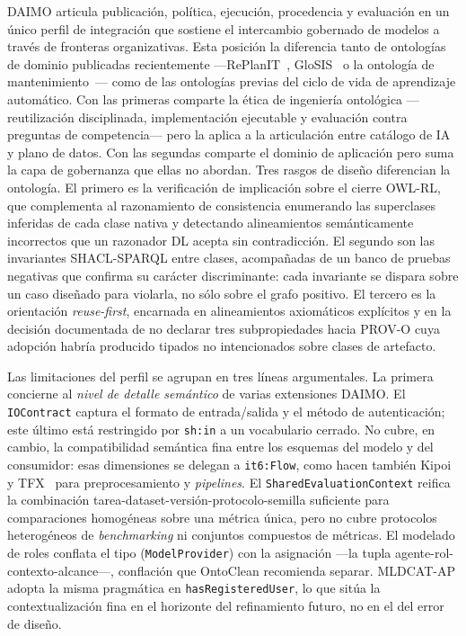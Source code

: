 \documentclass[11pt,a4paper]{article}
\newcommand{\code}[1]{\texttt{#1}}
\begin{document}
DAIMO articula publicación, política, ejecución, procedencia y evaluación en un único perfil de integración que sostiene el intercambio gobernado de modelos a través de fronteras organizativas. Esta posición la diferencia tanto de ontologías de dominio publicadas recientemente ---RePlanIT~\cite{kurteva}, GloSIS~\cite{palma} o la ontología de mantenimiento~\cite{woods}--- como de las ontologías previas del ciclo de vida de aprendizaje automático. Con las primeras comparte la ética de ingeniería ontológica ---reutilización disciplinada, implementación ejecutable y evaluación contra preguntas de competencia--- pero la aplica a la articulación entre catálogo de IA y plano de datos. Con las segundas comparte el dominio de aplicación pero suma la capa de gobernanza que ellas no abordan. Tres rasgos de diseño diferencian la ontología. El primero es la verificación de implicación sobre el cierre OWL-RL, que complementa al razonamiento de consistencia enumerando las superclases inferidas de cada clase nativa y detectando alineamientos semánticamente incorrectos que un razonador DL acepta sin contradicción. El segundo son las invariantes SHACL-SPARQL entre clases, acompañadas de un banco de pruebas negativas que confirma su carácter discriminante: cada invariante se dispara sobre un caso diseñado para violarla, no sólo sobre el grafo positivo. El tercero es la orientación \emph{reuse-first}, encarnada en alineamientos axiomáticos explícitos y en la decisión documentada de no declarar tres subpropiedades hacia PROV-O cuya adopción habría producido tipados no intencionados sobre clases de artefacto.

Las limitaciones del perfil se agrupan en tres líneas argumentales. La primera concierne al \emph{nivel de detalle semántico} de varias extensiones DAIMO. El \code{IOContract} captura el formato de entrada/salida y el método de autenticación; este último está restringido por \code{sh:in} a un vocabulario cerrado. No cubre, en cambio, la compatibilidad semántica fina entre los esquemas del modelo y del consumidor: esas dimensiones se delegan a \code{it6:Flow}, como hacen también Kipoi~\cite{kipoi} y TFX~\cite{tfx} para preprocesamiento y \emph{pipelines}. El \code{SharedEvaluationContext} reifica la combinación tarea-dataset-versión-protocolo-semilla suficiente para comparaciones homogéneas sobre una métrica única, pero no cubre protocolos heterogéneos de \emph{benchmarking} ni conjuntos compuestos de métricas. El modelado de roles conflata el tipo (\code{ModelProvider}) con la asignación ---la tupla agente-rol-contexto-alcance---, conflación que OntoClean recomienda separar. MLDCAT-AP adopta la misma pragmática en \code{hasRegisteredUser}, lo que sitúa la contextualización fina en el horizonte del refinamiento futuro, no en el del error de diseño.
\end{document}
